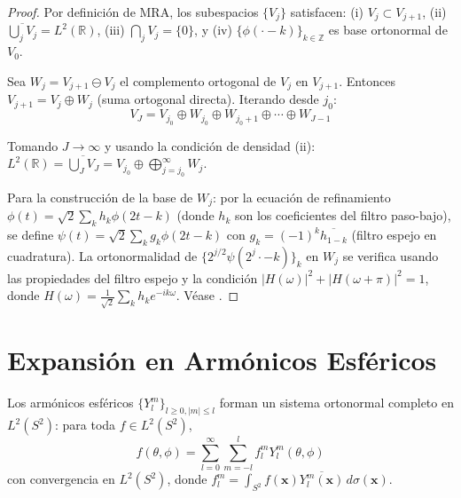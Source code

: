 \begin{proof}
Por definición de MRA, los subespacios $\{V_j\}$ satisfacen: (i) $V_j \subset V_{j+1}$, (ii) $\overline{\bigcup_j V_j} = L^2(\mathbb{R})$, (iii) $\bigcap_j V_j = \{0\}$, y (iv) $\{\phi(\cdot - k)\}_{k \in \mathbb{Z}}$ es base ortonormal de $V_0$.

Sea $W_j = V_{j+1} \ominus V_j$ el complemento ortogonal de $V_j$ en $V_{j+1}$. Entonces $V_{j+1} = V_j \oplus W_j$ (suma ortogonal directa). Iterando desde $j_0$:
\[
V_J = V_{j_0} \oplus W_{j_0} \oplus W_{j_0+1} \oplus \cdots \oplus W_{J-1}
\]

Tomando $J \to \infty$ y usando la condición de densidad (ii): $L^2(\mathbb{R}) = \overline{\bigcup_J V_J} = V_{j_0} \oplus \bigoplus_{j=j_0}^{\infty} W_j$.

Para la construcción de la base de $W_j$: por la ecuación de refinamiento $\phi(t) = \sqrt{2} \sum_k h_k \phi(2t - k)$ (donde $h_k$ son los coeficientes del filtro paso-bajo), se define $\psi(t) = \sqrt{2} \sum_k g_k \phi(2t - k)$ con $g_k = (-1)^k \overline{h_{1-k}}$ (filtro espejo en cuadratura). La ortonormalidad de $\{2^{j/2}\psi(2^j \cdot - k)\}_k$ en $W_j$ se verifica usando las propiedades del filtro espejo y la condición $|H(\omega)|^2 + |H(\omega + \pi)|^2 = 1$, donde $H(\omega) = \frac{1}{\sqrt{2}} \sum_k h_k e^{-ik\omega}$. Véase \citep[Capítulo~7]{Mallat2009}.
\end{proof}

\section{Expansión en Armónicos Esféricos}\label{sec:expansion_armonicos_esfericos}

\begin{theorem}\label{thm:expansion_armonicos_apendice}
Los armónicos esféricos $\{Y_l^m\}_{l \geq 0, |m| \leq l}$ forman un sistema ortonormal completo en $L^2(S^2)$: para toda $f \in L^2(S^2)$,
\[
f(\theta, \phi) = \sum_{l=0}^{\infty} \sum_{m=-l}^{l} f_l^m Y_l^m(\theta, \phi)
\]
con convergencia en $L^2(S^2)$, donde $f_l^m = \int_{S^2} f(\mathbf{x}) \overline{Y_l^m(\mathbf{x})} \, d\sigma(\mathbf{x})$.
\end{theorem}

